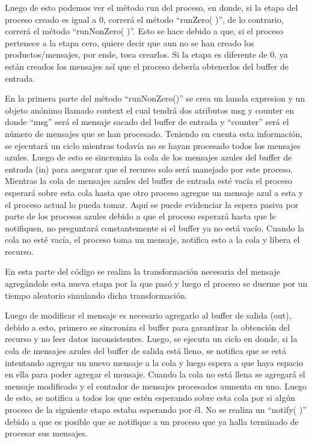 \documentclass[a4paper]{article}
\begin{document}
        Luego de esto podemos ver el método run del proceso, en donde, si la etapa del proceso creado es igual a 0, correrá el método “runZero( )”, de lo contrario, correrá el método “runNonZero( )”. Esto se hace debido a que, si el proceso pertenece a la etapa cero, quiere decir que aun no se han creado los productos/mensajes, por ende, toca crearlos. Si la etapa es diferente de 0, ya están creados los mensajes así que el proceso debería obtenerlos del buffer de entrada. 
        
        En la primera parte del método “runNonZero()” se crea un lamda expresion y un objeto anónimo llamado context el cual tendrá dos atributos msg y counter en donde “msg” será el mensaje sacado del buffer de entrada y “counter” será el número de mensajes que se han procesado. Teniendo en cuenta esta información, se ejecutará un ciclo mientras todavía no se hayan procesado todos los mensajes azules. Luego de esto se sincroniza la cola de los mensajes azules del buffer de entrada (in) para asegurar que el recurso solo será manejado por este proceso. Mientras la cola de mensajes azules del buffer de entrada esté vacía el proceso esperará sobre esta cola hasta que otro proceso agregue un mensaje azul a esta y el proceso actual lo pueda tomar. Aquí se puede evidenciar la espera pasiva por parte de los procesos azules debido a que el proceso esperará hasta que le notifiquen, no preguntará constantemente si el buffer ya no está vacío. Cuando la cola no esté vacía, el proceso toma un mensaje, notifica esto a la cola y libera el recurso. 

        En esta parte del código se realiza la transformación necesaria del mensaje agregándole esta nueva etapa por la que pasó y luego el proceso se duerme por un tiempo aleatorio simulando dicha transformación. 

        Luego de modificar el mensaje es necesario agregarlo al buffer de salida (out), debido a esto, primero se sincroniza el buffer para garantizar la obtención del recurso y no leer datos inconsistentes. Luego, se ejecuta un ciclo en donde, si la cola de mensajes azules del buffer de salida está lleno, se notifica que se está intentando agregar un nuevo mensaje a la cola y luego espera a que haya espacio en ella para poder agregar el mensaje. Cuando la cola no está llena se agregará el mensaje modificado y el contador de mensajes procesados aumenta en uno. Luego de esto, se notifica a todos los que estén esperando sobre esta cola por si algún proceso de la siguiente etapa estaba esperando por él. No se realiza un “notify( )” debido a que es posible que se notifique a un proceso que ya halla terminado de procesar sus mensajes. 
\end{document}

